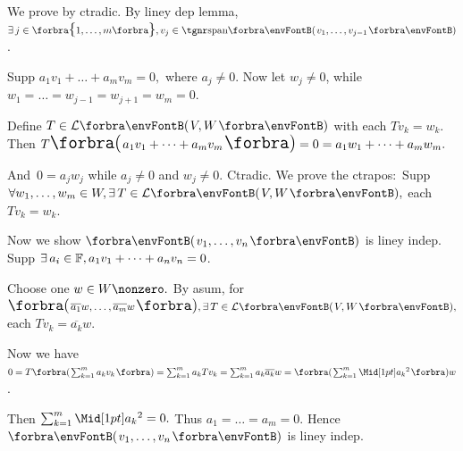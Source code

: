 \par\quad
We prove by ctradic. By liney dep lemma, $\exists\,j\in\Bra{1,\dots,m},v_j\in\Span{v_1,\dots,v_{j-1}}$.\par\quad
Supp $a_1 v_1+\dots+a_m v_m=0,$ where $a_j\neq 0.$ \;Now let $w_j\neq 0$, while $w_1=\dots=w_{j-1}=w_{j+1}=w_m=0.$\par\quad
Define $T\in\Lm{V,W}$ with each $Tv_k=w_k$. Then $T\BigPar{a_1 v_1+\dots+a_m v_m}=0=a_1 w_1+\dots+a_m w_m.$\par\quad
And \,$0=a_j w_j$ while $a_j\neq 0$ and $w_j\neq 0.$ Ctradic.\PfEnd\vspace{4pt}\quad
\Or We prove the ctrapos\hspace{1pt}: \,Supp $\forall w_1,\dots,w_m\in W,\exists\,T\in\Lm{V,W},$ each $Tv_k=w_k.$\par\quad
{Now we show $\Par{v_1,\dots,v_n}$ is liney indep. Supp {$\exists\,a_i\in{\mathbb{F}},a_1 v_1+\dots+a_n v_n=0$}.}\vspace{2pt}\par\quad
{Choose one $w\in W\nonzero.$ By asum, for {$\BigPar{\overline{a_1}w,\dots,\overline{a_m}w},\exists\,T\in\Lm{V,W},$ each $Tv_k=\overline{a_k}w.$}}\vspace{2pt}\par\quad
{Now we have {$ 0=T\BigBigPar{{\sum_{k=1}^m a_k v_k}}=\sum_{k=1}^m a_k Tv_k=\sum_{k=1}^m a_k\overline{a_k}w=\BigBigPar{{\sum_{k=1}^m \aMid{a_k}{^2}}}w$}.}\vspace{2pt}\par\quad
{Then {$\sum_{k=1}^m\aMid{a_k}{^2}=0.$ Thus $a_1=\dots=a_m=0.$} Hence $\Par{v_1,\dots,v_n}$ is liney indep.}\PfEnd
\SepLine

